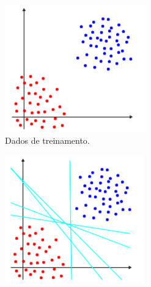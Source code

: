 \documentclass[12pt]{beamer}
\theoremstyle{definition}%
\begin{document}
\begin{frame}
\begin{figure}[h] 
	\centering
	\begin{subfigure}[h]{0.4\textwidth}
		\centering
		\includegraphics[width=\textwidth]{dados_treinamento}
		\caption{Dados de treinamento. \label{fig2:a}}
	\end{subfigure}
	\begin{subfigure}[h]{0.38\textwidth}
		\centering
		\includegraphics[width=\textwidth]{hiperplanos_separadores}

\end{subfigure}
\end{figure}
\end{frame}
\end{document}
